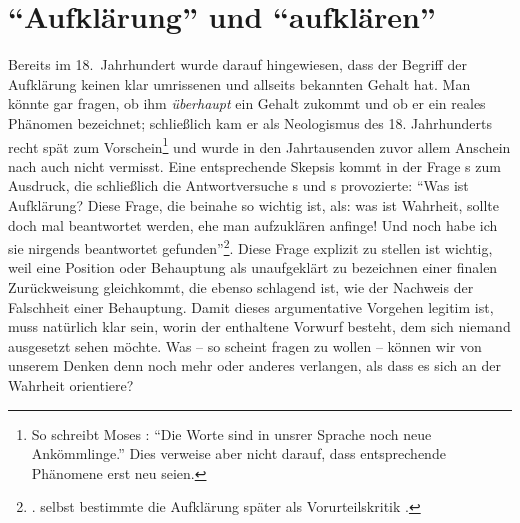 \section{\enquote{Aufklärung} und \enquote{aufklären}}
Bereits im 18.\ Jahrhundert wurde darauf hingewiesen, dass der Begriff der
Aufklärung keinen klar umrissenen und allseits bekannten Gehalt hat. Man könnte
gar fragen, ob ihm \emph{überhaupt} ein Gehalt zukommt und ob er ein reales
Phänomen bezeichnet; schließlich kam er als Neologismus des 18.
Jahrhunderts recht spät zum
Vorschein\footnote{\label{Anmerkung:MosesMendelssohnZumNeologismus}So
schreibt Moses
\textcite[][3]{Mendelssohn:UeberdieFrage:washeisstaufklaeren?2008}: \enquote{Die
Worte  sind in unsrer Sprache noch neue
Ankömmlinge.} Dies verweise aber nicht darauf, dass entsprechende Phänomene erst
neu seien.} und wurde in den Jahrtausenden
zuvor allem Anschein nach auch nicht vermisst. Eine entsprechende Skepsis kommt in der Frage s
zum Ausdruck, die schließlich die Antwortversuche s und
s provozierte: \enquote{Was ist Aufklärung? Diese
Frage, die beinahe so wichtig ist, als: was ist Wahrheit, sollte doch mal
beantwortet werden, ehe man aufzuklären anfinge! Und noch habe ich sie nirgends
beantwortet
gefunden}\footnote{\cite[][516]{Zoellner:IstesrathsamdasEhebuendnissnichtfernerdurchdieReligionzusancieren?1783}.
selbst bestimmte die Aufklärung später als Vorurteilskritik
\parencite[siehe
dazu][\pno~271\,f.]{Schneiders:AufklaerungundVorurteilskritik1983}.}.
Diese Frage explizit zu stellen ist wichtig, weil eine Position oder Behauptung
als unaufgeklärt zu bezeichnen einer finalen Zurückweisung gleichkommt, die
ebenso schlagend ist, wie der Nachweis der Falschheit einer Behauptung.
Damit dieses argumentative Vorgehen legitim ist, muss natürlich klar sein, worin
der enthaltene Vorwurf besteht, dem sich niemand ausgesetzt sehen möchte. Was --
so scheint
fragen zu wollen -- können wir von unserem Denken denn noch mehr oder anderes
verlangen, als dass es sich an der Wahrheit orientiere?

